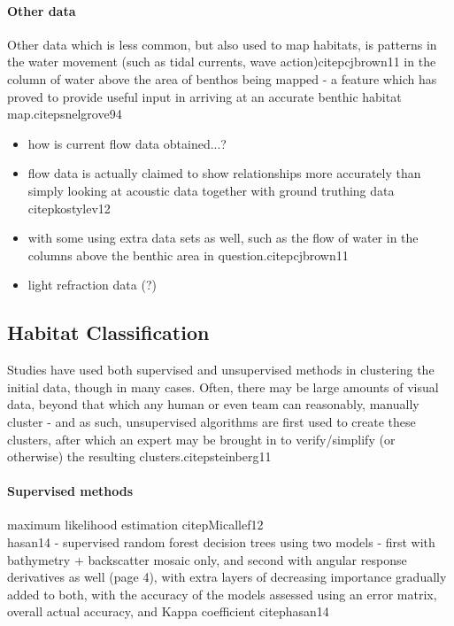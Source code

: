 \documentclass[12pt]{article}
\begin{document}
\begin{multicols}{2}
            \paragraph{Other data}
            Other data which is less common, but also used to map habitats, is patterns in the water movement (such as tidal currents, wave action)citep{cjbrown11} in the column of water above the area of benthos being mapped - a feature which has proved to provide useful input in arriving at an accurate benthic habitat map.citep{snelgrove94}

            \begin{itemize}
                \item how is current flow data obtained...? 
                \item flow data is actually claimed to show relationships more accurately than simply looking at acoustic data together with ground truthing data citep{kostylev12}
                \item with some using extra data sets as well, such as the flow of water in the columns above the benthic area in question.citep{cjbrown11}
                \item light refraction data (?)
            \end{itemize}

            \subsection{Habitat Classification}

            Studies have used both supervised and unsupervised methods in clustering the initial data, though in many cases. Often, there may be large amounts of visual data, beyond that which any human or even team can reasonably, manually cluster - and as such, unsupervised algorithms are first used to create these clusters, after which an expert may be brought in to verify/simplify (or otherwise) the resulting clusters.citep{steinberg11} 

            \paragraph{Supervised methods}
            maximum likelihood estimation citep{Micallef12} \\
            hasan14 - supervised random forest decision trees using two models - first with bathymetry + backscatter mosaic only, and second with angular response derivatives as well (page 4), with extra layers of decreasing importance gradually added to both, with the accuracy of the models assessed using an error matrix, overall actual accuracy, and Kappa coefficient citep{hasan14}


\end{multicols}
\end{document}
